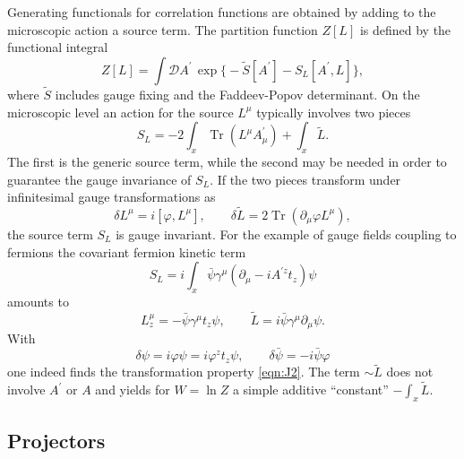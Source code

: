 \documentclass[twocolumn,aps,prd,amsmath,amssymb,preprintnumbers,longbibliography]{revtex4-1}
\numberwithin{equation}{section}
\DeclareMathOperator{\Tr}{Tr}
\begin{document}
Generating functionals for correlation functions are obtained by adding to the microscopic action a source term. The partition function $Z[L]$ is defined by the functional integral
\begin{equation}
	Z[L]
	= \int \mathcal{D} A^\prime \, \exp\bigl\{-\tilde{S}[A^\prime] - S_L[A^\prime,L]\bigr\},
\end{equation}
where $\tilde{S}$ includes gauge fixing and the Faddeev-Popov determinant. On the microscopic level an action for the source $L^\mu$ typically involves two pieces
\begin{equation}\label{eqn:J1}
	S_L
	= -2 \int_x \Tr(L^\mu A_\mu^\prime) + \int_x \tilde{L}.
\end{equation}
The first is the generic source term, while the second may be needed in order to guarantee the gauge invariance of $S_L$. If the two pieces transform under infinitesimal gauge transformations as
\begin{equation}\label{eqn:J2}
	\delta L^\mu
	= i [\varphi,L^\mu],
	\qquad
	\delta \tilde{L}
	= 2 \Tr(\partial_\mu \varphi L^\mu),
\end{equation}
the source term $S_L$ is gauge invariant. For the example of gauge fields coupling to fermions the covariant fermion kinetic term
\begin{equation}\label{eqn:J3}
	S_L
	= i \int_x \bar\psi \gamma^\mu (\partial_\mu - i A^{\prime z} t_z) \psi
\end{equation}
amounts to
\begin{equation}\label{eqn:J4}
	L^\mu_z
	= -\bar \psi\gamma^\mu t_z\psi,
	\qquad
	\tilde{L}
	= i\bar \psi\gamma^\mu\partial_\mu\psi.
\end{equation}
With
\begin{equation}\label{eqn:J5}
	\delta\psi
	= i \varphi \psi
	= i \varphi^z t_z \psi,
	\qquad
	\delta\bar\psi
	= -i \bar\psi \varphi
\end{equation}
one indeed finds the transformation property \eqref{eqn:J2}. The term $\sim \tilde{L}$ does not involve $A^\prime$ or $A$ and yields for $W = \ln Z$ a simple additive ``constant'' $-\int_x \tilde{L}$.


\subsection{Projectors}
\end{document}
